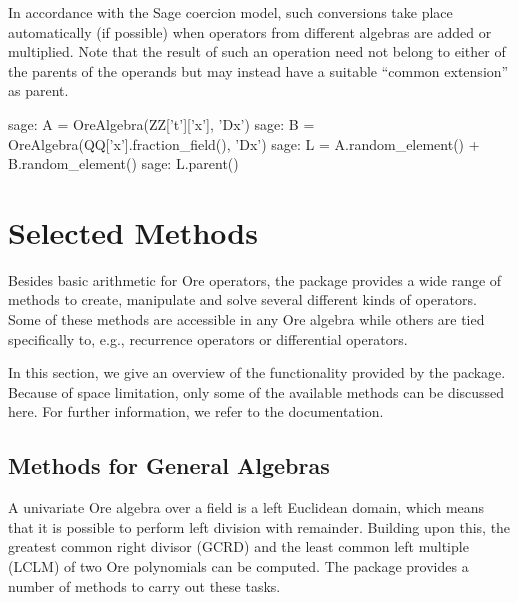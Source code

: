 \documentclass[11pt]{amsart}
\begin{document}
In accordance with the Sage coercion model, such conversions take place automatically (if possible) 
when operators from different algebras are added or multiplied. Note that the result of such an operation
need not belong to either of the parents of the operands but may instead have a suitable ``common extension'' 
as parent. 

\begin{sageexample}
  sage: A = OreAlgebra(ZZ['t']['x'], 'Dx')
  sage: B = OreAlgebra(QQ['x'].fraction_field(), 'Dx')
  sage: L = A.random_element() + B.random_element()
  sage: L.parent()
\end{sageexample}

\section{Selected Methods}\label{sec:4}

Besides basic arithmetic for Ore operators, the package provides a wide range of
methods to create, manipulate and solve several different kinds of operators.
Some of these methods are accessible in any Ore algebra while others are tied
specifically to, e.g., recurrence operators or differential operators. 

In this section, we give an overview of the functionality provided by
the package. Because of space limitation, only some of the available methods
can be discussed here. For further information, we refer to the documentation. 

\subsection{Methods for General Algebras}

A univariate Ore algebra over a field is a left Euclidean domain, which means
that it is possible to perform left division with remainder. Building upon this,
the greatest common right divisor (GCRD) and the least common left multiple
(LCLM) of two Ore polynomials can be computed. The package provides a number of
methods to carry out these tasks.
\end{document}
